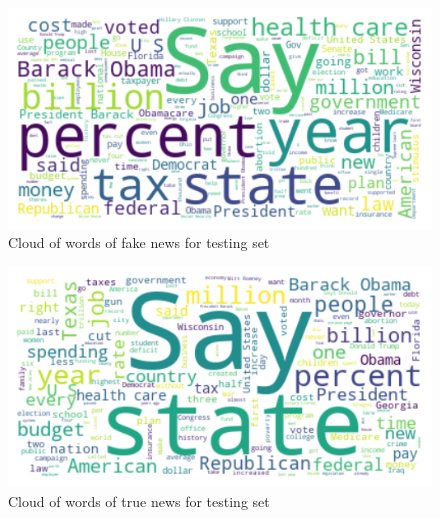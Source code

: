 \begin{figure}[!htbp]
\centering
\includegraphics[width=0.7\linewidth]{wordcloud_test_fake.png}
\caption{Cloud of words of fake news for testing set}
\label{wordcloud_test_fake}
\end{figure}

\begin{figure}[!htbp]
\centering
\includegraphics[width=0.7\linewidth]{wordcloud_test_true.png}
\caption{Cloud of words of true news for testing set}
\label{wordcloud_test_true}
\end{figure}